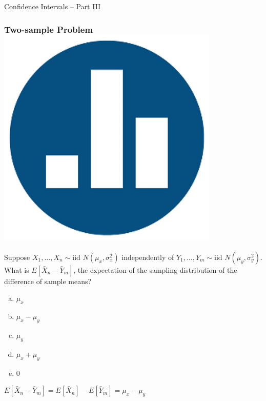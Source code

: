 \documentclass[handout]{beamer}
\date{Lecture 17}
\begin{document}
 





\begin{frame}[plain]
	\titlepage 
	

\end{frame} 




\begin{frame}

\centering \Huge Confidence Intervals -- Part III

\end{frame}



\begin{frame}
\frametitle{Two-sample Problem \hfill \includegraphics[scale = 0.05]{./images/clicker}}
Suppose $X_1, \hdots, X_{n} \sim \mbox{iid } N(\mu_x, \sigma^2_x)$ independently of $Y_1, \hdots, Y_{m} \sim \mbox{iid } N(\mu_y, \sigma^2_y)$. What is \alert{$E[\bar{X}_n - \bar{Y}_m]$}, the expectation of the sampling distribution of the difference of sample means?

\begin{enumerate}[(a)]
	\item $\mu_x$
	\item $\mu_x - \mu_y$
	\item $\mu_y$
	\item $\mu_x + \mu_y$
	\item 0
\end{enumerate}

\pause
\vspace{1em} 

\alert{$E[\bar{X}_n - \bar{Y}_m] = E[\bar{X}_n] - E[\bar{Y}_m] = \mu_x - \mu_y$}
\end{frame}
\end{document}
